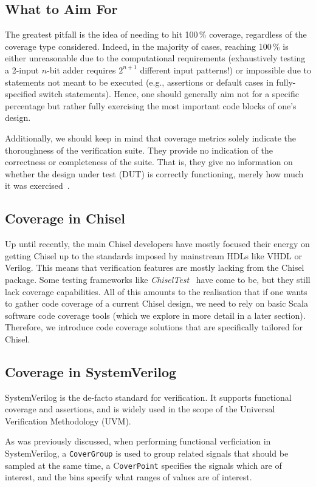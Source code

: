 \documentclass[conference]{IEEEtran}
\begin{document}
\subsection{What to Aim For}

The greatest pitfall is the idea of needing to hit 100\,\% coverage, regardless of the coverage type considered. Indeed, in the majority of cases, reaching 100\,\% is either unreasonable due to the computational requirements (exhaustively testing a 2-input $n$-bit adder requires $2^{n+1}$ different input patterns!) or impossible due to statements not meant to be executed (e.g., assertions or default cases in fully-specified switch statements). Hence, one should generally aim not for a specific percentage but rather fully exercising the most important code blocks of one's design.

Additionally, we should keep in mind that coverage metrics solely indicate the thoroughness of the verification suite. They provide no indication of the correctness or completeness of the suite. That is, they give no information on whether the design under test (DUT) is correctly functioning, merely how much it was exercised~\cite{hdlverify}.

\subsection{Coverage in Chisel} Up until recently, the main Chisel developers have mostly focused their energy on getting Chisel up to the standards imposed by mainstream HDLs like VHDL or Verilog. This means that verification features are mostly lacking from the Chisel package. Some testing frameworks like \textit{ChiselTest}~\cite{chisel:tester2} have come to be, but they still lack coverage capabilities. All of this amounts to the realisation that if one wants to gather code coverage of a current Chisel design, we need to rely on basic Scala software code coverage tools (which we explore in more detail in a later section). Therefore, we introduce code coverage solutions that are specifically tailored for Chisel.

\subsection{Coverage in SystemVerilog}
SystemVerilog is the de-facto standard for verification. It supports functional coverage and assertions, and is widely used in the scope of the Universal Verification Methodology (UVM). 

As was previously discussed, when performing functional verficiation in SystemVerilog, a \texttt{CoverGroup} is used to group related signals that should be sampled at the same time, a C\texttt{overPoint} specifies the signals which are of interest, and the bins specify what ranges of values are of interest.
\end{document}
